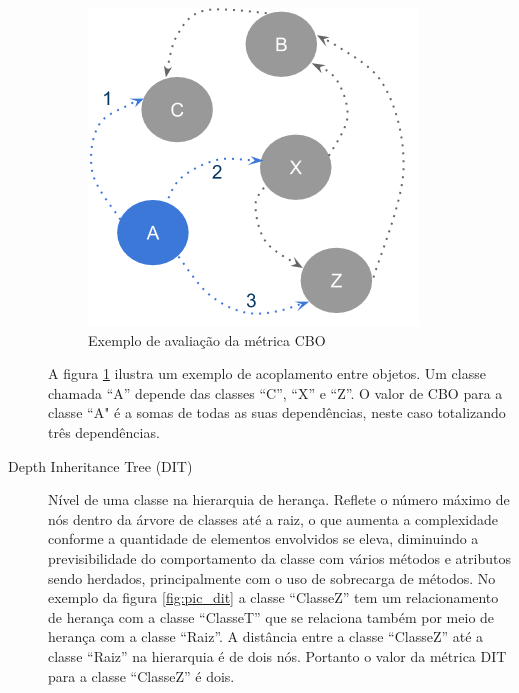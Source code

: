 \begin{description}
\begin{figure}[htb]
	\caption{\label{fig:pic_cbo}Exemplo de avaliação da métrica CBO}
	\begin{center}
		\includegraphics[scale=0.8]{img/pic_cbo.png}
	\end{center}
\end{figure}

A figura \ref{fig:pic_cbo} ilustra um exemplo de acoplamento entre objetos. Um
classe chamada ``A'' depende das classes ``C'', ``X'' e ``Z''. O
valor de CBO para a classe ``A" é a somas de todas as suas
dependências, neste caso totalizando três dependências.

\vspace{\onelineskip}
\item[Depth Inheritance Tree (DIT)] Nível de uma classe na
hierarquia de herança. Reflete o número máximo de nós  dentro da árvore
de classes até a raiz, o que aumenta a complexidade conforme a quantidade de
elementos envolvidos se eleva, diminuindo a previsibilidade do comportamento da
classe com vários métodos e atributos sendo herdados, principalmente com o uso
de sobrecarga de métodos. No exemplo da figura \ref{fig:pic_dit} a classe
``ClasseZ'' tem um relacionamento de herança com a classe ``ClasseT'' que se
relaciona também por meio de herança com a classe ``Raiz''. A distância entre a
classe ``ClasseZ'' até a classe ``Raiz'' na hierarquia é de dois nós. Portanto o
valor da métrica DIT para a classe ``ClasseZ'' é dois.



\end{description}
